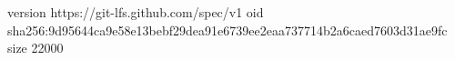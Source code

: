 version https://git-lfs.github.com/spec/v1
oid sha256:9d95644ca9e58e13bebf29dea91e6739ee2eaa737714b2a6caed7603d31ae9fc
size 22000

